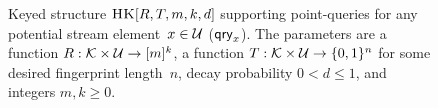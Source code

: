 \begin{figure}[h]
\begin{pchstack}[boxed,center,space=0.5em]
		\begin{pcvstack}[space=0.45em]
            \procedure[linenumbering, headlinecmd={\vspace{.1em}\hrule\vspace{.2em}}]{$\Up_{K}(A,\up_x)$}{%
                (p_1,\ldots,p_k) \gets R(K,x) \\
                \mathrm{fp}_{x} \gets T(K,x)\\
                \pcfor i \in [k]\\
                \t{\pcif} A[i][p_i].\fp \, {\not\in} \{\fp_x, {\star}\} \\
                \t \t r \getsr \left[0,1\right)\\
                \t \t \pcif r \leq d^{A[i][p_i].\cnt}\\
                \t\t\t A[i][p_i].\cnt \,{-}{=}\, 1 \\%
                \pcgraycomment{overtake the counter if $0$} \\ %
                \t\pcif  A[i][p_i].\cnt = 0 \\
                \t\t A[i][p_i].\fp  \gets \fp_x \\ %
                \pcgraycomment{increase the count if $\fp = \fp_x$} \\ %
                \t\pcif A[i][p_i].\fp = \fp_x \\
                \t\t A[i][p_i].\cnt \,{+}{=}\, 1 \\ %
                \pcreturn A 
            }
			\end{pcvstack}
    
    \end{pchstack}
\caption[The HeavyKeeper Structure.]{Keyed structure $\textnormal{\textsc{HK}}[R,T,m,k,d]$ supporting point-queries for any potential stream element~$x\in\mathcal{U}$ ($\mathsf{qry}_x$). The parameters are a function $R: \mathcal{K}\times\mathcal{U} \to [m]^k$, a function $T: \mathcal{K}\times\mathcal{U} \to \{0,1\}^n$ for some desired fingerprint length~$n$, decay probability $0<d\leq1$, and integers $m,k\geq 0$.} 
\label{fig:hk}
\end{figure}
